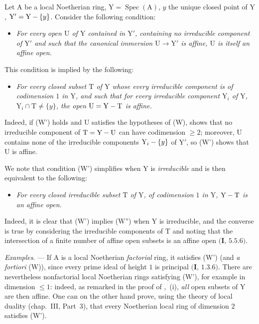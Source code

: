 \begin{env}[21.12.8]
\label{IV.21.12.8}
Let $\mathrm{A}$ be a local Noetherian ring, $\mathrm{Y}=\operatorname{Spec}(\mathrm{A})$, $y$ the unique closed point of $\mathrm{Y}$, $\mathrm{Y}'=\mathrm{Y}-\{y\}$.
Consider the following condition:
\begin{itemize}
  \item[\textup{(W)}] \emph{For every open $\mathrm{U}$ of $\mathrm{Y}$ contained in $\mathrm{Y}'$, containing no irreducible component of $\mathrm{Y}'$ and such that the canonical immersion $\mathrm{U}\to\mathrm{Y}'$ is affine, $\mathrm{U}$ is itself an affine open.}
\end{itemize}

This condition is implied by the following:
\begin{itemize}
  \item[\textup{(W')}] \emph{For every closed subset $\mathrm{T}$ of $\mathrm{Y}$ whose every irreducible component is of codimension $1$ in $\mathrm{Y}$, and such that for every irreducible component $\mathrm{Y}_i$ of $\mathrm{Y}$, $\mathrm{Y}_i\cap\mathrm{T}\neq\{y\}$, the open $\mathrm{U}=\mathrm{Y}-\mathrm{T}$ is affine.}
\end{itemize}

Indeed, if (W') holds and $\mathrm{U}$ satisfies the hypotheses of (W),  shows that no irreducible component of $\mathrm{T}=\mathrm{Y}-\mathrm{U}$ can have codimension $\geq 2$; moreover, $\mathrm{U}$ contains none of the irreducible components $\mathrm{Y}_i-\{y\}$ of $\mathrm{Y}'$, so (W') shows that $\mathrm{U}$ is affine.

We note that condition (W') simplifies when $\mathrm{Y}$ is \emph{irreducible} and is then equivalent to the following:
\begin{itemize}
  \item[\textup{(W'')}] \emph{For every closed irreducible subset $\mathrm{T}$ of $\mathrm{Y}$, of codimension $1$ in $\mathrm{Y}$, $\mathrm{Y}-\mathrm{T}$ is an affine open.}
\end{itemize}

Indeed, it is clear that (W') implies (W'') when $\mathrm{Y}$ is irreducible, and the converse is true by considering the irreducible components of $\mathrm{T}$ and noting that the intersection of a finite number of affine open subsets is an affine open $(\mathbf{I}$, $5.5.6)$.
\end{env}

\begin{env}[21.12.9]
\label{IV.21.12.9}
\emph{Examples}. ---
If $\mathrm{A}$ is a local Noetherian \emph{factorial} ring, it satisfies (W') (and \emph{a fortiori} (W)), since every prime ideal of height $1$ is principal $(\mathbf{I}$, $1.3.6)$.
There are nevertheless nonfactorial local Noetherian rings satisfying (W'), for example in dimension $\leq 1$: indeed, as remarked in the proof of ,~(i), \emph{all} open subsets of $\mathrm{Y}$ are then affine.
One can on the other hand prove, using the theory of local duality (chap.~III, Part~3), that every Noetherian local ring of dimension $2$ satisfies (W').
\end{env}


